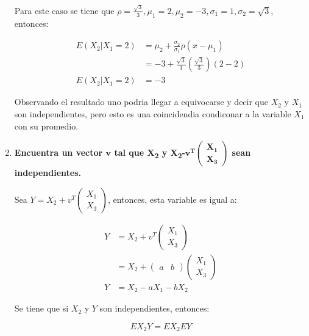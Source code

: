 \begin{enumerate}
          Para este caso se tiene que $\rho = \frac{\sqrt{3}}{3}, \mu_1=2, \mu_2 = -3,\sigma_1=1 ,\sigma_2 = \sqrt{3}$, entonces:

          \begin{align*}
              E(X_2 | X_1=2) & = \mu_2 + \frac{\sigma_2}{\sigma_1} \rho (x-\mu_1)              \\
                             & = -3 + \frac{\sqrt{3}}{1}\left (\frac{\sqrt{3}}{3}\right )(2-2) \\
              E(X_2 | X_1=2) & = -3
          \end{align*}

          Observando el resultado uno podria llegar a equivocarse y decir que $X_2$ y $X_1$ son independientes, pero esto es una coincidendia condiconar a la variable $X_1$ con su promedio.

    \item \textbf{Encuentra un vector $\mathbf{v}$ tal que X\textsubscript{2} y X\textsubscript{2}-$\mathbf{v^T \begin{pmatrix} X_1 \\ X_3 \end{pmatrix}}$ sean independientes.}

          Sea $Y=X_2 + v^T \begin{pmatrix}
                  X_1 \\ X_3
              \end{pmatrix}$, entonces, esta variable es igual a:

          \begin{align*}
              Y & = X_2 + v^T \begin{pmatrix}
                  X_1 \\ X_3
              \end{pmatrix}                        \\
                & = X_2 + \begin{pmatrix}
                  a & b
              \end{pmatrix} \begin{pmatrix}
                  X_1 \\ X_3
              \end{pmatrix} \\
              Y & = X_2 -aX_1 -b X_2
          \end{align*}

          Se tiene que si $X_2$ y $Y$ son independientes, entonces:

          \begin{equation*}
              EX_2Y = EX_2 EY
          \end{equation*}


\end{enumerate}

